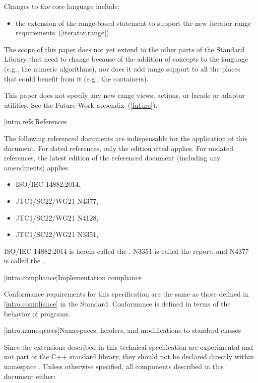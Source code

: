 \pnum
Changes to the core language include:

\begin{itemize}
\item the extension of the range-based  statement to support
the new iterator range requirements~(\ref{iterator.range}).
\end{itemize}

\pnum
The scope of this paper does not yet extend to the other parts of the Standard Library
that need to change because of the addition of concepts to the language (e.g., the numeric
algorithms), nor does it add range support to all the places that could benefit from it (e.g.,
the containers).

\pnum
This paper does not specify any new range views, actions, or facade or adaptor
utilities. See the Future Work appendix~(\ref{future}).

[intro.refs]{References}

\pnum
The following referenced documents are indispensable for the
application of this document. For dated references, only the
edition cited applies. For undated references, the latest edition
of the referenced document (including any amendments) applies.

\begin{itemize}
\item ISO/IEC 14882:2014, 
\item JTC1/SC22/WG21 N4377, 
\item JTC1/SC22/WG21 N4128, 
\item JTC1/SC22/WG21 N3351, 
\end{itemize}

ISO/IEC 14882:2014 is herein called the , N3351 is called the
 report, and N4377 is called the .

[intro.compliance]{Implementation compliance}

\pnum
Conformance requirements for this specification are the same as those
defined in \ref{intro.compliance} in the \Cpp Standard.
\enternote
Conformance is defined in terms of the behavior of programs.
\exitnote

[intro.namespaces]{Namespaces, headers, and modifications to standard classes}

\pnum
Since the extensions described in this technical specification are experimental and not
part of the C++ standard library, they should not be declared directly within namespace
. Unless otherwise specified, all components described in this document either:

